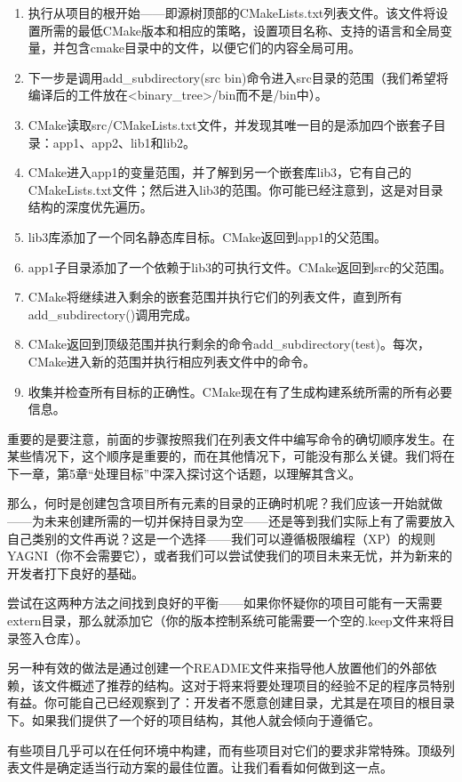 \begin{enumerate}
\item
执行从项目的根开始——即源树顶部的CMakeLists.txt列表文件。该文件将设置所需的最低CMake版本和相应的策略，设置项目名称、支持的语言和全局变量，并包含cmake目录中的文件，以便它们的内容全局可用。

\item
下一步是调用add\_subdirectory(src bin)命令进入src目录的范围（我们希望将编译后的工件放在<binary\_tree>/bin而不是/bin中）。

\item
CMake读取src/CMakeLists.txt文件，并发现其唯一目的是添加四个嵌套子目录：app1、app2、lib1和lib2。

\item
CMake进入app1的变量范围，并了解到另一个嵌套库lib3，它有自己的CMakeLists.txt文件；然后进入lib3的范围。你可能已经注意到，这是对目录结构的深度优先遍历。

\item
lib3库添加了一个同名静态库目标。CMake返回到app1的父范围。

\item
app1子目录添加了一个依赖于lib3的可执行文件。CMake返回到src的父范围。

\item
CMake将继续进入剩余的嵌套范围并执行它们的列表文件，直到所有add\_subdirectory()调用完成。

\item
CMake返回到顶级范围并执行剩余的命令add\_subdirectory(test)。每次，CMake进入新的范围并执行相应列表文件中的命令。

\item
收集并检查所有目标的正确性。CMake现在有了生成构建系统所需的所有必要信息。
\end{enumerate}

重要的是要注意，前面的步骤按照我们在列表文件中编写命令的确切顺序发生。在某些情况下，这个顺序是重要的，而在其他情况下，可能没有那么关键。我们将在下一章，第5章“处理目标”中深入探讨这个话题，以理解其含义。

那么，何时是创建包含项目所有元素的目录的正确时机呢？我们应该一开始就做——为未来创建所需的一切并保持目录为空——还是等到我们实际上有了需要放入自己类别的文件再说？这是一个选择——我们可以遵循极限编程（XP）的规则YAGNI（你不会需要它），或者我们可以尝试使我们的项目未来无忧，并为新来的开发者打下良好的基础。

尝试在这两种方法之间找到良好的平衡——如果你怀疑你的项目可能有一天需要extern目录，那么就添加它（你的版本控制系统可能需要一个空的.keep文件来将目录签入仓库）。

另一种有效的做法是通过创建一个README文件来指导他人放置他们的外部依赖，该文件概述了推荐的结构。这对于将来将要处理项目的经验不足的程序员特别有益。你可能自己已经观察到了：开发者不愿意创建目录，尤其是在项目的根目录下。如果我们提供了一个好的项目结构，其他人就会倾向于遵循它。

有些项目几乎可以在任何环境中构建，而有些项目对它们的要求非常特殊。顶级列表文件是确定适当行动方案的最佳位置。让我们看看如何做到这一点。




